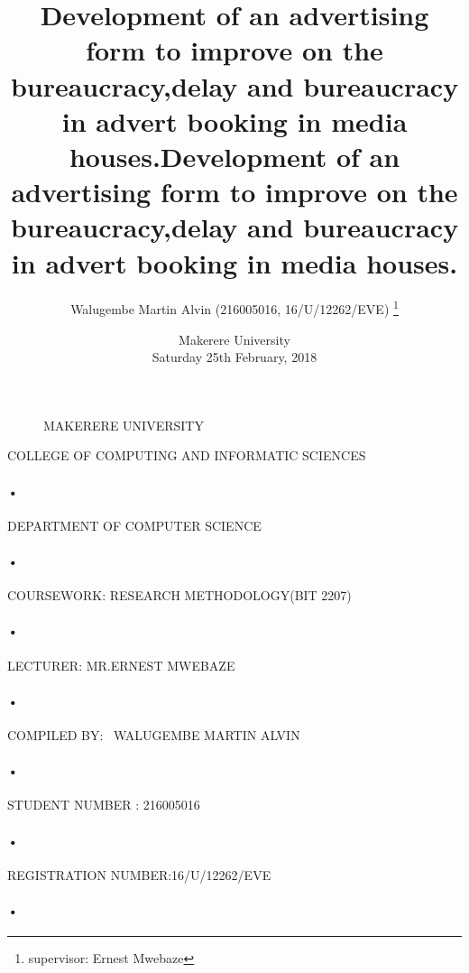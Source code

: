 \documentclass[11pt,A4paper]{article}
\begin{document}
\begin{titlepage}
  \begin{figure}[h]
  \centerline{\small MAKERERE 
UNIVERSITY}
\end{figure}
\centerline{COLLEGE OF COMPUTING AND INFORMATIC SCIENCES}
\paragraph{•}\centerline{DEPARTMENT OF COMPUTER SCIENCE\\}
\paragraph{•}

\centerline{COURSEWORK: RESEARCH METHODOLOGY(BIT 2207)\\}
\paragraph{•}

\centerline{LECTURER: MR.ERNEST MWEBAZE}

\paragraph{•}
\centerline{COMPILED BY: \
 WALUGEMBE MARTIN ALVIN}
 \paragraph{•}
\centerline{STUDENT NUMBER : 216005016}
\paragraph{•}
\centerline{REGISTRATION NUMBER:16/U/12262/EVE}

\title{Development of an advertising form to improve on the bureaucracy,delay and bureaucracy in advert booking in media houses.}


\author{Walugembe Martin Alvin (216005016, 16/U/12262/EVE) \thanks{supervisor: Ernest Mwebaze}}
\date{%
    Makerere University\\%
    Saturday 25th February, 2018
}



\paragraph{•}
\end{titlepage}

\title{Development of an advertising form to improve on the bureaucracy,delay and bureaucracy in advert booking in media houses.}
\end{document}
